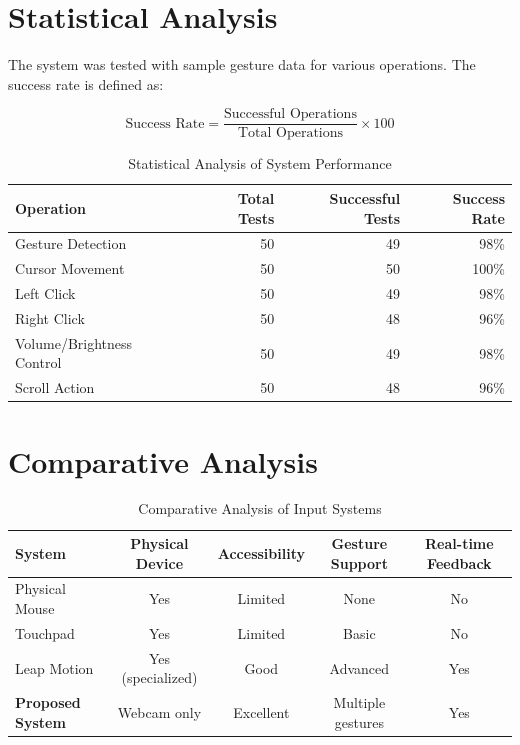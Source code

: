 \documentclass[12pt,a4paper]{report}
\begin{document}
\section{Statistical Analysis}

The system was tested with sample gesture data for various operations. The success rate is
defined as:

\[
  \text{Success Rate} = \frac{\text{Successful Operations}}{\text{Total Operations}} \times 100
\]

\begin{table}[ht]
\centering
\caption{Statistical Analysis of System Performance}
\begin{tabular}{lrrr}
\toprule
\textbf{Operation} & \textbf{Total Tests} & \textbf{Successful Tests} & \textbf{Success Rate} \\
\midrule
Gesture Detection          & 50 & 49 & 98\% \\
Cursor Movement            & 50 & 50 & 100\% \\
Left Click                 & 50 & 49 & 98\% \\
Right Click                & 50 & 48 & 96\% \\
Volume/Brightness Control  & 50 & 49 & 98\% \\
Scroll Action              & 50 & 48 & 96\% \\
\bottomrule
\end{tabular}
\end{table}

\section{Comparative Analysis}

\begin{table}[ht]
\centering
\caption{Comparative Analysis of Input Systems}
\begin{tabularx}{\textwidth}{Xcccc}
\toprule
\textbf{System} & \textbf{Physical Device} & \textbf{Accessibility} & \textbf{Gesture Support} & \textbf{Real-time Feedback} \\
\midrule
Physical Mouse         & Yes            & Limited   & None              & No  \\
Touchpad               & Yes            & Limited   & Basic             & No  \\
Leap Motion            & Yes (specialized) & Good   & Advanced          & Yes \\
\textbf{Proposed System} & Webcam only  & Excellent & Multiple gestures & Yes \\
\bottomrule
\end{tabularx}
\end{table}
\end{document}
